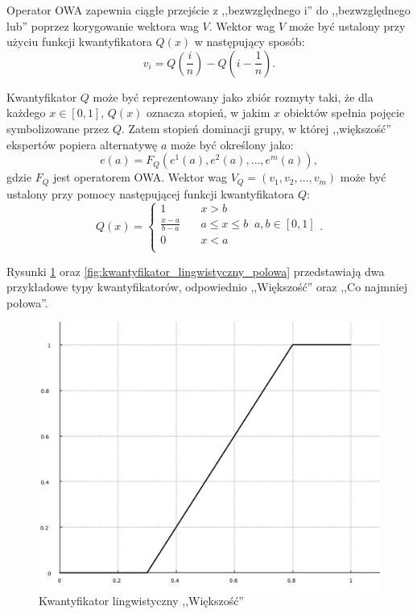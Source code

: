 Operator OWA zapewnia ciągłe przejście z ,,bezwzględnego i'' do ,,bezwzględnego
lub'' poprzez korygowanie wektora wag $V$. Wektor wag $V$ może być ustalony przy
użyciu funkcji kwantyfikatora $Q(x)$ w następujący sposób:
$$v_i = Q(\frac{i}{n}) - Q(i - \frac{1}{n}).$$

Kwantyfikator $Q$ może być reprezentowany jako zbiór rozmyty taki, że dla
każdego $x \in [0,1]$, $Q(x)$ oznacza stopień, w jakim $x$ obiektów spełnia
pojęcie symbolizowane przez $Q$. Zatem stopień dominacji grupy, w której
,,większość'' ekspertów popiera alternatywę $a$ może być określony jako:
$$e(a) = F_Q(e^1(a),e^2(a),\dotsc,e^m(a)),$$
gdzie $F_Q$ jest operatorem OWA. Wektor wag $V_Q = (v_1,v_2,\dotsc,v_m)$ może
być ustalony przy pomocy następującej funkcji kwantyfikatora $Q$:
$$
Q(x) = 
\left\{ 
	\begin{array}{cl}
	  1					& \quad  x > b \\
      \frac{x-a}{b-a} 	& \quad  a \leq x \leq b \;\; a,b \in [0,1] \\
      0 				& \quad  x < a \\
  	\end{array} 
  \right..
$$

Rysunki \ref{fig:kwantyfikator_lingwistyczny_wiekszosc} oraz
\ref{fig:kwantyfikator_lingwistyczny_polowa} przedstawiają dwa przykładowe typy
kwantyfikatorów, odpowiednio ,,Większość'' oraz ,,Co najmniej połowa''.

\begin{figure}[ht]
  \includegraphics[width=\linewidth]
  	{chapters/fuzzylogic/fuzzy_most}
  \caption{Kwantyfikator lingwistyczny ,,Większość''}
  \label{fig:kwantyfikator_lingwistyczny_wiekszosc}
\end{figure}

